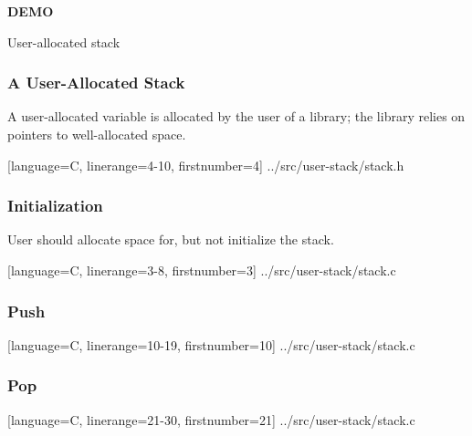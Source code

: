 \begin{frame}

\begin{center}

\Huge \textbf{DEMO}

\bigskip

\large User-allocated stack

\end{center}

\end{frame}


\begin{frame}[fragile]

\frametitle{A User-Allocated Stack}

\begin{center}

A user-allocated variable is allocated by the user of a library; the library
relies on pointers to well-allocated space.

\end{center}

\pause

\vspace{\fill}

%
  [language=C, linerange={4-10}, firstnumber=4]%
  {../src/user-stack/stack.h}

\end{frame}


\begin{frame}[fragile]

\frametitle{Initialization}

\begin{center}

User should allocate space for, but not initialize the stack.

\end{center}

%
  [language=C, linerange={3-8}, firstnumber=3]%
  {../src/user-stack/stack.c}

\end{frame}


\begin{frame}[fragile]

\frametitle{Push}

%
  [language=C, linerange={10-19}, firstnumber=10]%
  {../src/user-stack/stack.c}

\end{frame}


\begin{frame}[fragile]

\frametitle{Pop}

%
  [language=C, linerange={21-30}, firstnumber=21]%
  {../src/user-stack/stack.c}

\end{frame}



